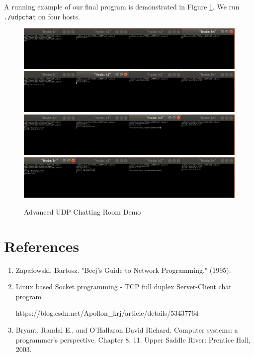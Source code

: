 \begin{exercise}[]
A running example of our final program is demonstrated in Figure \ref{fig:ex3}. We run \texttt{./udpchat} on four hosts.


\begin{figure}[hb]
  \begin{center}
  \includegraphics[width=14cm]{img/lab3/udpadv1.png}
  \includegraphics[width=14cm]{img/lab3/udpadv2.png}
  \includegraphics[width=14cm]{img/lab3/udpadv3.png}
  \includegraphics[width=14cm]{img/lab3/udpadv4.png}
  \caption{Advanced UDP Chatting Room Demo}
  \label{fig:ex3}
  \end{center}
\end{figure}

  \label{ex3}
\end{exercise}



\appendix

\section{References}

\begin{enumerate}
  \item Zapałowski, Bartosz. "Beej’s Guide to Network Programming." (1995).
  \item Linux based Socket programming - TCP full duplex Server-Client chat program 
  
  {\ttfamily https://blog.csdn.net/Apollon\_krj/article/details/53437764}
  \item Bryant, Randal E., and O'Hallaron David Richard. Computer systems: a programmer's perspective. Chapter 8, 11. Upper Saddle River: Prentice Hall, 2003.
\end{enumerate}